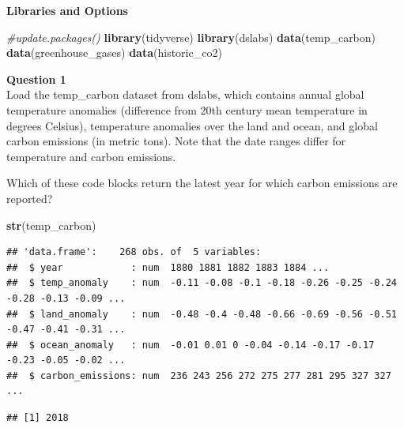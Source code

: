 \documentclass[
]{article}
\newenvironment{Shaded}{\begin{snugshade}}{\end{snugshade}}
\newcommand{\CommentTok}[1]{\textcolor[rgb]{0.56,0.35,0.01}{\textit{#1}}}
\newcommand{\KeywordTok}[1]{\textcolor[rgb]{0.13,0.29,0.53}{\textbf{#1}}}
\newcommand{\NormalTok}[1]{#1}
\newcommand{\OperatorTok}[1]{\textcolor[rgb]{0.81,0.36,0.00}{\textbf{#1}}}
\newcommand{\StringTok}[1]{\textcolor[rgb]{0.31,0.60,0.02}{#1}}
\begin{document}
\textbf{Libraries and Options}

\begin{Shaded}
\begin{Highlighting}[]
\CommentTok{#update.packages()}
\KeywordTok{library}\NormalTok{(tidyverse)}
\KeywordTok{library}\NormalTok{(dslabs)}
\KeywordTok{data}\NormalTok{(temp_carbon)}
\KeywordTok{data}\NormalTok{(greenhouse_gases)}
\KeywordTok{data}\NormalTok{(historic_co2)}
\end{Highlighting}
\end{Shaded}

\textbf{Question 1}\\
Load the temp\_carbon dataset from dslabs, which contains annual global
temperature anomalies (difference from 20th century mean temperature in
degrees Celsius), temperature anomalies over the land and ocean, and
global carbon emissions (in metric tons). Note that the date ranges
differ for temperature and carbon emissions.

Which of these code blocks return the latest year for which carbon
emissions are reported?

\begin{Shaded}
\begin{Highlighting}[]
\KeywordTok{str}\NormalTok{(temp_carbon)}
\end{Highlighting}
\end{Shaded}

\begin{verbatim}
## 'data.frame':    268 obs. of  5 variables:
##  $ year            : num  1880 1881 1882 1883 1884 ...
##  $ temp_anomaly    : num  -0.11 -0.08 -0.1 -0.18 -0.26 -0.25 -0.24 -0.28 -0.13 -0.09 ...
##  $ land_anomaly    : num  -0.48 -0.4 -0.48 -0.66 -0.69 -0.56 -0.51 -0.47 -0.41 -0.31 ...
##  $ ocean_anomaly   : num  -0.01 0.01 0 -0.04 -0.14 -0.17 -0.17 -0.23 -0.05 -0.02 ...
##  $ carbon_emissions: num  236 243 256 272 275 277 281 295 327 327 ...
\end{verbatim}

\begin{Shaded}
\end{Shaded}

\begin{verbatim}
## [1] 2018
\end{verbatim}
\end{document}
